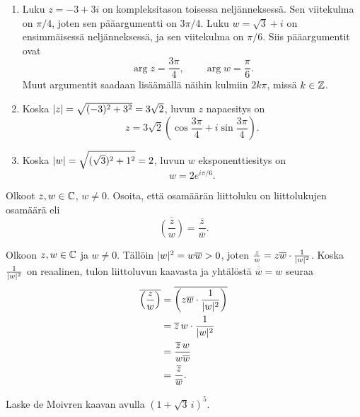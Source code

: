 \documentclass[11pt,a4paper]{amsart}
\begin{document}
\begin{solution}
\leavevmode\par
\begin{enumerate}[label=\alph*), nosep]
\item Luku \(z=-3+3i\) on kompleksitason toisessa neljänneksessä.
Sen viitekulma on \(\pi/4\), joten sen pääargumentti on \(3\pi/4\).
Luku \(w=\sqrt{3}+i\) on ensimmäisessä neljänneksessä, ja sen
viitekulma on \(\pi/6\). Siis pääargumentit ovat
\[
\arg z = \frac{3\pi}{4}, \qquad \arg w = \frac{\pi}{6}.
\]
Muut argumentit saadaan lisäämällä näihin kulmiin \(2k\pi\), missä
\(k \in \mathbb{Z}\).
\item Koska \(\lvert z\rvert=\sqrt{(-3)^2+3^2}=3\sqrt{2}\), luvun \(z\)
napaesitys on
\[
z=3\sqrt{2}\left(\cos\frac{3\pi}{4}
+i\sin\frac{3\pi}{4}\right).
\]
\item Koska \(\lvert w\rvert=\sqrt{(\sqrt{3})^2+1^2}=2\), luvun \(w\)
eksponenttiesitys on
\[
w=2e^{i\pi/6}.
\]
\end{enumerate}
\end{solution}

\begin{exercise}
Olkoot \(z,w \in \mathbb{C}\), \(w \neq 0\). Osoita, että osamäärän liittoluku on
liittolukujen osamäärä eli
\[
\overline{\left(\frac{z}{w}\right)} = \frac{\overline{z}}{\overline{w}}.
\]
\end{exercise}

\begin{solution}
Olkoon \(z,w \in \mathbb{C}\) ja \(w \neq 0\). Tällöin
\(\lvert w\rvert^2=w\overline{w}>0\), joten
\(\frac{z}{w}=z\overline{w}\cdot\frac{1}{\lvert w\rvert^2}\).
Koska \(\frac{1}{\lvert w\rvert^2}\) on reaalinen, tulon liittoluvun kaavasta
ja yhtälöstä \(\overline{\overline{w}}=w\) seuraa
\[
\begin{aligned}
\overline{\left(\frac{z}{w}\right)}
&=\overline{\left(z\overline{w}\cdot\frac{1}{\lvert w\rvert^2}\right)} \\
&=\overline{z}\,w\cdot\frac{1}{\lvert w\rvert^2} \\
&=\frac{\overline{z}\,w}{w\overline{w}} \\
&=\frac{\overline{z}}{\overline{w}}.
\end{aligned}
\]
\end{solution}

\begin{exercise}
Laske de Moivren kaavan avulla \((1 + \sqrt{3}\,i)^5\).
\end{exercise}
\end{document}
